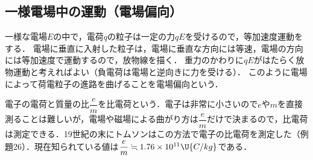 \subsection{一様電場中の運動（電場偏向）}

一様な電場$E$の中で，電荷$q$の粒子は一定の力$qE$を受けるので，{\gtfamily 等加速度運動}をする．
電場に垂直に入射した粒子は，電場に垂直な方向には等速，電場の方向には等加速度で運動するので，{\gtfamily 放物線}を描く．
重力のかわりに$qE$がはたらく放物運動と考えればよい（負電荷は電場と逆向きに力を受ける）．
このように電場によって荷電粒子の進路を曲げることを{\gtfamily 電場偏向}という．

電子の電荷と質量の比$\dfrac{e}{m}$を{\gtfamily 比電荷}という．電子は非常に小さいので$e$や$m$を直接測ることは難しいが，電場や磁場による曲がり方は$\dfrac{e}{m}$だけで決まるので，比電荷は測定できる．19世紀の末にトムソンはこの方法で電子の比電荷を測定した（例題26）．現在知られている値は$\dfrac{e}{m}\fallingdotseq 1.76\times 10^{11}\U{C/kg}$である．

